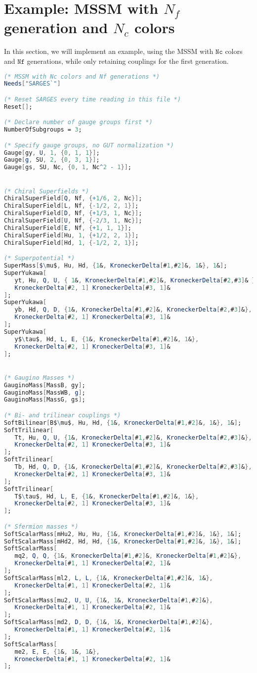 \documentclass{scrartcl}
\begin{document}
\section{Example: MSSM with $N_f$ generation and $N_c$ colors}
In this section, we will implement an example, using the MSSM with $\mathtt{Nc}$ colors and $\mathtt{Nf}$ generations, while only retaining couplings for the first generation.
\begin{lstlisting}[language=mathematica,mathescape,columns=flexible,backgroundcolor=\color{light-gray}]
(* MSSM with Nc colors and Nf generations *)
Needs["SARGES`"]

(* Reset SARGES every time reading in this file *)
Reset[];

(* Declare number of gauge groups first *)
NumberOfSubgroups = 3;

(* Specify gauge groups, no GUT normalization *)
Gauge[gy, U, 1, {0, 1, 1}];
Gauge[g, SU, 2, {0, 3, 1}];
Gauge[gs, SU, Nc, {0, 1, Nc^2 - 1}];


(* Chiral Superfields *)
ChiralSuperField[Q, Nf, {+1/6, 2, Nc}];
ChiralSuperField[L, Nf, {-1/2, 2, 1}];
ChiralSuperField[D, Nf, {+1/3, 1, Nc}];
ChiralSuperField[U, Nf, {-2/3, 1, Nc}];
ChiralSuperField[E, Nf, {+1, 1, 1}];
ChiralSuperField[Hu, 1, {+1/2, 2, 1}];
ChiralSuperField[Hd, 1, {-1/2, 2, 1}];

(* Superpotential *)
SuperMass[$\mu$, Hu, Hd, {1&, KroneckerDelta[#1,#2]&, 1&}, 1&];
SuperYukawa[
   yt, Hu, Q, U, { 1&, KroneckerDelta[#1,#2]&, KroneckerDelta[#2,#3]& }, 
   KroneckerDelta[#2, 1] KroneckerDelta[#3, 1]&
];
SuperYukawa[
   yb, Hd, Q, D, {1&, KroneckerDelta[#1,#2]&, KroneckerDelta[#2,#3]&}, 
   KroneckerDelta[#2, 1] KroneckerDelta[#3, 1]&
];
SuperYukawa[
   y$\tau$, Hd, L, E, {1&, KroneckerDelta[#1,#2]&, 1&},
   KroneckerDelta[#2, 1] KroneckerDelta[#3, 1]&
];


(* Gaugino Masses *)
GauginoMass[MassB, gy];
GauginoMass[MassWB, g];
GauginoMass[MassG, gs];

(* Bi- and trilinear couplings *)
SoftBilinear[B$\mu$, Hu, Hd, {1&, KroneckerDelta[#1,#2]&, 1&}, 1&];
SoftTrilinear[
   Tt, Hu, Q, U, {1&, KroneckerDelta[#1,#2]&, KroneckerDelta[#2,#3]&},
   KroneckerDelta[#2, 1] KroneckerDelta[#3, 1]&
];
SoftTrilinear[
   Tb, Hd, Q, D, {1&, KroneckerDelta[#1,#2]&, KroneckerDelta[#2,#3]&},
   KroneckerDelta[#2, 1] KroneckerDelta[#3, 1]&
];
SoftTrilinear[
   T$\tau$, Hd, L, E, {1&, KroneckerDelta[#1,#2]&, 1&}, 
   KroneckerDelta[#2, 1] KroneckerDelta[#3, 1]&
];

(* Sfermion masses *)
SoftScalarMass[mHu2, Hu, Hu, {1&, KroneckerDelta[#1,#2]&, 1&}, 1&];
SoftScalarMass[mHd2, Hd, Hd, {1&, KroneckerDelta[#1,#2]&, 1&}, 1&];
SoftScalarMass[
   mq2, Q, Q, {1&, KroneckerDelta[#1,#2]&, KroneckerDelta[#1,#2]&}, 
   KroneckerDelta[#1, 1] KroneckerDelta[#2, 1]&
];
SoftScalarMass[ml2, L, L, {1&, KroneckerDelta[#1,#2]&, 1&}, 
   KroneckerDelta[#1, 1] KroneckerDelta[#2, 1]&
];
SoftScalarMass[mu2, U, U, {1&, 1&, KroneckerDelta[#1,#2]&}, 
   KroneckerDelta[#1, 1] KroneckerDelta[#2, 1]&
];
SoftScalarMass[md2, D, D, {1&, 1&, KroneckerDelta[#1,#2]&}, 
   KroneckerDelta[#1, 1] KroneckerDelta[#2, 1]&
];
SoftScalarMass[
   me2, E, E, {1&, 1&, 1&}, 
   KroneckerDelta[#1, 1] KroneckerDelta[#2, 1]&
];


\end{lstlisting}
\end{document}
